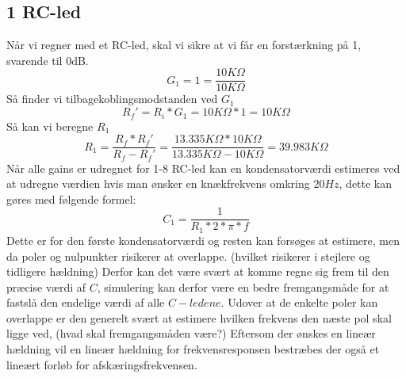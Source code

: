 \subsection{1 RC-led}
Når vi regner med et RC-led, skal vi sikre at vi får en forstærkning på 1, svarende til 0dB. 
%
\begin{equation}
	G_1 = 1 = \frac{10K\Omega}{10K\Omega}
\end{equation}
\noindent
%
Så finder vi tilbagekoblingsmodstanden ved $G_1$
%
\begin{equation}
	R_f' = R_i*G_1 = 10K\Omega*1 = 10K\Omega
\end{equation}
\noindent
%
Så kan vi beregne $R_1$
%
\begin{equation}
	R_1 = \frac{R_f*R_f'}{R_f-R_f'} = \frac{13.335K\Omega*10K\Omega}{13.335K\Omega-10K\Omega} = 39.983K\Omega
\end{equation}
\noindent
Når alle gains er udregnet for 1-8 RC-led kan en kondensatorværdi estimeres ved at udregne værdien hvis man ønsker en knækfrekvens omkring $20 Hz$, dette kan gøres med følgende formel:
\begin{equation}
C_1=\frac{1}{R_1*2*\pi*f}
\end{equation}
Dette er for den første kondensatorværdi og resten kan forsøges at estimere, men da poler og nulpunkter risikerer at overlappe. (hvilket risikerer i stejlere og tidligere hældning)
Derfor kan det være svært at komme regne sig frem til den præcise værdi af $C$, simulering kan derfor være en bedre fremgangsmåde for at fastslå den endelige værdi af alle $C-ledene$. 
Udover at de enkelte poler kan overlappe er den generelt svært at estimere hvilken frekvens den næste pol skal ligge ved, (hvad skal fremgangsmåden være?)
Eftersom der ønskes en lineær hældning vil en lineær hældning for frekvensresponsen bestræbes der også et lineært forløb for afskæringsfrekvensen.

